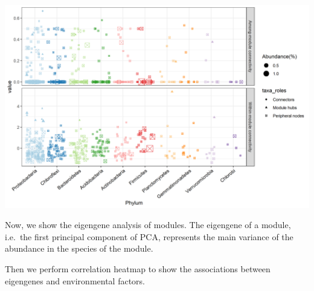 \documentclass[
]{book}
\newenvironment{Shaded}{\begin{snugshade}}{\end{snugshade}}
\newcommand{\AttributeTok}[1]{\textcolor[rgb]{0.77,0.63,0.00}{#1}}
\newcommand{\CommentTok}[1]{\textcolor[rgb]{0.56,0.35,0.01}{\textit{#1}}}
\newcommand{\DecValTok}[1]{\textcolor[rgb]{0.00,0.00,0.81}{#1}}
\newcommand{\FunctionTok}[1]{\textcolor[rgb]{0.00,0.00,0.00}{#1}}
\newcommand{\NormalTok}[1]{#1}
\newcommand{\OtherTok}[1]{\textcolor[rgb]{0.56,0.35,0.01}{#1}}
\newcommand{\SpecialCharTok}[1]{\textcolor[rgb]{0.00,0.00,0.00}{#1}}
\begin{document}
\begin{center}\includegraphics[width=800px]{Images/trans_network_taxa_roles_2} \end{center}

Now, we show the eigengene analysis of modules.
The eigengene of a module, i.e.~the first principal component of PCA, represents the main variance of the abundance in the species of the module.

\begin{Shaded}
\end{Shaded}

Then we perform correlation heatmap to show the associations between eigengenes and environmental factors.

\begin{Shaded}
\end{Shaded}
\end{document}
